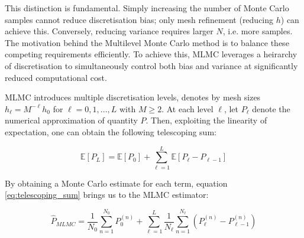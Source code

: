 This distinction is fundamental. Simply increasing the number of Monte Carlo samples cannot reduce 
discretisation bias;
only mesh refinement (reducing $h$) can achieve this. Conversely, reducing variance requires larger $N$, 
i.e. more samples. The motivation behind the Multilevel Monte Carlo method is to balance these 
competing requirements efficiently. To achieve this, MLMC leverages a heirarchy of discretisation 
to simultaneously control both bias and variance at significantly reduced computational cost.

MLMC introduces multiple discretisation levels, denotes by mesh sizes $h_\ell = M^{-\ell}h_0$ for 
$\ell = 0, 1, ..., L$ with $M \geq 2$. At each level $\ell$, let $P_\ell$ denote the numerical approximation
of quantity $P$. Then, exploiting the linearity of expectation, one can obtain the following telescoping
sum:

\begin{equation}\label{eq:telescoping_sum}
    \mathbb{E}\left[P_L\right] = \mathbb{E}\left[P_0\right]  + 
    \sum_{\ell = 1}^{L} \mathbb{E}\left[P_\ell - P_{\ell - 1}\right]
\end{equation}

By obtaining a Monte Carlo estimate for each term, equation \eqref{eq:telescoping_sum} brings us to the 
MLMC estimator:

\begin{equation}\label{eq:MLMC_estimator}
    \hat{P}_{MLMC} = \frac{1}{N_0}\sum_{n=1}^{N_0} P_0^{(n)} + 
    \sum_{\ell=1}^{L}\frac{1}{N_{\ell}} \sum_{n=1}^{N_\ell} \left(P_\ell^{(n)} - P_{\ell-1}^{(n)}\right)
\end{equation}
